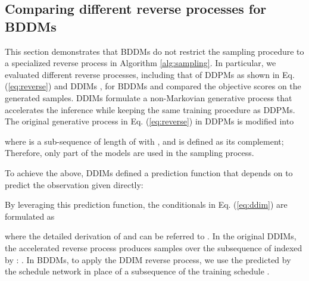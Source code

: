 \subsection{Comparing different reverse processes for BDDMs}
This section demonstrates that BDDMs do not restrict the sampling procedure to a specialized reverse process in Algorithm \ref{alg:sampling}. In particular, we evaluated different reverse processes, including that of DDPMs as shown in Eq. (\ref{eq:reverse}) and DDIMs \citep{jiaming2021}, for BDDMs and compared the objective scores on the generated samples. DDIMs \citep{jiaming2021} formulate a non-Markovian generative process that accelerates the inference while keeping the same training procedure as DDPMs. The original generative process in Eq. (\ref{eq:reverse}) in DDPMs is modified into

where  is a sub-sequence of length  of  with , and  is defined as its complement; Therefore, only part of the models are used in the sampling process. 

To achieve the above, DDIMs defined a prediction function  that depends on  to predict the observation  given  directly:

By leveraging this prediction function, the conditionals in Eq. (\ref{eq:ddim}) are formulated as

where the detailed derivation of  and  can be referred to \citep{jiaming2021}. In the original DDIMs, the accelerated reverse process produces samples over the subsequence of  indexed by : . In BDDMs, to apply the DDIM reverse process, we use the  predicted by the schedule network in place of a subsequence of the training schedule .

